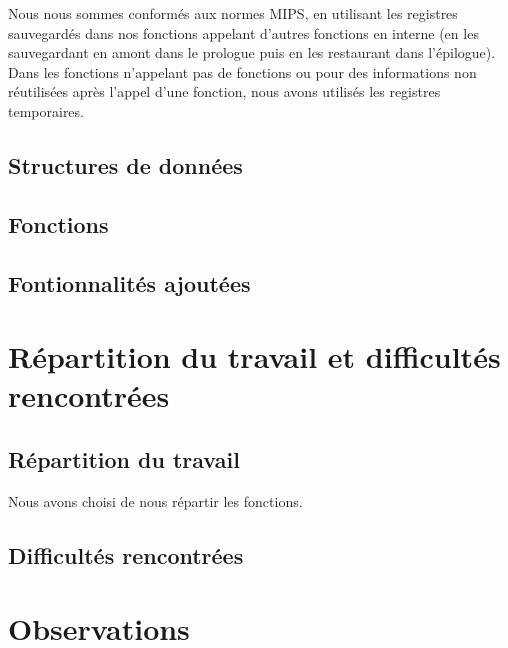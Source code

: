 \documentclass[a4paper]{article}
\begin{document}
Nous nous sommes conformés aux normes MIPS, en utilisant les registres sauvegardés
dans nos fonctions appelant d'autres fonctions en interne (en les sauvegardant en amont dans le prologue puis en les restaurant dans l'épilogue).
Dans les fonctions n'appelant pas de fonctions ou pour des informations non réutilisées après l'appel d'une fonction,
nous avons utilisés les registres temporaires.

\subsection{Structures de données}

\subsection{Fonctions}

\subsection{Fontionnalités ajoutées}

\section{Répartition du travail et difficultés rencontrées}

\subsection{Répartition du travail}
Nous avons choisi de nous répartir les fonctions. 

\subsection{Difficultés rencontrées}

\section{Observations}
\end{document}
